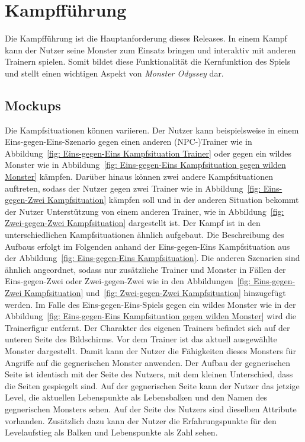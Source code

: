 \section{Kampfführung}\label{sec:kampf-führen}
Die Kampfführung ist die Hauptanforderung dieses Releases.
In einem Kampf kann der Nutzer seine Monster zum Einsatz bringen und interaktiv mit anderen Trainern spielen. Somit bildet diese Funktionalität die Kernfunktion des Spiels und stellt einen wichtigen Aspekt von\textit{ Monster Odyssey} dar.
\subsection{Mockups}\label{subsec:mockups-kampf-führen}
Die Kampfsituationen können variieren.
Der Nutzer kann beispielsweise in einem Eins-gegen-Eins-Szenario gegen einen anderen (NPC-)Trainer wie in Abbildung~\ref{fig: Eins-gegen-Eins Kampfsituation Trainer} oder gegen ein wildes Monster wie in Abbildung~\ref{fig: Eins-gegen-Eins Kampfsituation gegen wilden Monster} kämpfen. 
Darüber hinaus können zwei andere Kampfsituationen auftreten, sodass der Nutzer gegen zwei Trainer wie in Abbildung~\ref{fig: Eins-gegen-Zwei Kampfsituation} kämpfen soll und in der anderen Situation bekommt der Nutzer Unterstützung von einem anderen Trainer, wie in Abbildung~\ref{fig: Zwei-gegen-Zwei Kampfsituation} dargestellt ist.
Der Kampf ist in den unterschiedlichen Kampfsituationen ähnlich aufgebaut. Die Beschreibung des Aufbaus erfolgt im Folgenden anhand der Eins-gegen-Eins Kampfsituation aus der Abbildung~\ref{fig: Eins-gegen-Eins Kampfsituation}.
Die anderen Szenarien sind ähnlich angeordnet, sodass nur zusätzliche Trainer und Monster in Fällen der Eins-gegen-Zwei oder Zwei-gegen-Zwei wie in den Abbildungen~\ref{fig: Eins-gegen-Zwei Kampfsituation} und~\ref{fig: Zwei-gegen-Zwei Kampfsituation} hinzugefügt werden. Im Falle des Eins-gegen-Eins-Spiels gegen ein wildes Monster wie in der Abbildung~\ref{fig: Eins-gegen-Eins Kampfsituation gegen wilden Monster} wird die Trainerfigur entfernt.
Der Charakter des eigenen Trainers befindet sich auf der unteren Seite des Bildschirms.
Vor dem Trainer ist das aktuell ausgewählte Monster dargestellt. Damit kann der Nutzer die Fähigkeiten dieses Monsters für Angriffe auf die gegnerischen Monster anwenden.
Der Aufbau der gegnerischen Seite ist identisch mit der Seite des Nutzers, mit dem kleinen Unterschied, dass die Seiten gespiegelt sind.
Auf der gegnerischen Seite kann der Nutzer das jetzige Level, die aktuellen Lebenspunkte als Lebensbalken und den Namen des gegnerischen Monsters sehen. Auf der Seite des Nutzers sind dieselben Attribute vorhanden. Zusätzlich dazu kann der Nutzer die Erfahrungspunkte für den Levelaufstieg als Balken und Lebenspunkte als Zahl sehen.
